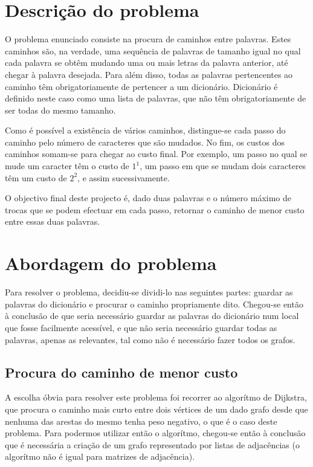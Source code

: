 \documentclass[a4paper, 11pt]{article}
\begin{document}


\pagestyle{fancy}
\tableofcontents
\newpage

\section{Descrição do problema}
    \par O problema enunciado consiste na procura de caminhos entre palavras. Estes caminhos são, na verdade, uma sequência de palavras de tamanho igual no qual cada palavra se obtêm mudando uma ou mais letras da palavra anterior, até chegar à palavra desejada. Para além disso, todas as palavras pertencentes ao caminho têm obrigatoriamente de pertencer a um dicionário. Dicionário é definido neste caso como uma lista de palavras, que não têm obrigatoriamente de ser todas do mesmo tamanho.
    \par Como é possível a existência de vários caminhos, distingue-se cada passo do caminho pelo número de caracteres que são mudados. No fim, os custos dos caminhos somam-se para chegar ao custo final. Por exemplo, um passo no qual se mude um caracter têm o custo de $1^1$, um passo em que se mudam dois caracteres têm um custo de $2^2$, e assim sucessivamente.
    \par O objectivo final deste projecto é, dado duas palavras e o número máximo de trocas que se podem efectuar em cada passo, retornar o caminho de menor custo entre essas duas palavras.
    
\section{Abordagem do problema}
    \par Para resolver o problema, decidiu-se dividi-lo nas seguintes partes: guardar as palavras do dicionário e procurar o caminho propriamente dito. Chegou-se então à conclusão de que seria necessário guardar as palavras do dicionário num local que fosse facilmente acessível, e que não seria necessário guardar todas as palavras, apenas as relevantes, tal como não é necessário fazer todos os grafos.
\subsection{Procura do caminho de menor custo}
    \par A escolha óbvia para resolver este problema foi recorrer ao algorítmo de Dijkstra, que procura o caminho mais curto entre dois vértices de um dado grafo desde que nenhuma das arestas do mesmo tenha peso negativo, o que é o caso deste problema. Para podermos utilizar então o algorítmo, chegou-se então à conclusão que é necessária a criação de um grafo representado por listas de adjacências (o algorítmo não é igual para matrizes de adjacência).
    
\end{document}
